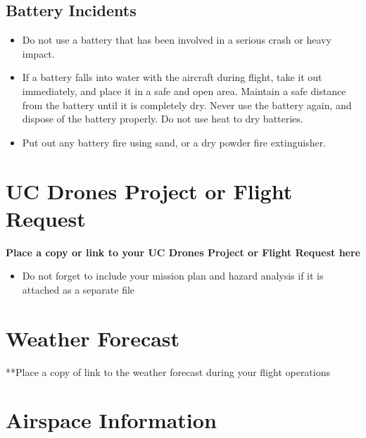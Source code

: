 \documentclass[
]{book}
\makeatletter
\providecommand{\tightlist}{%
  \setlength{\itemsep}{0pt}\setlength{\parskip}{0pt}}
\let\origdoublepage\cleardoublepage
\newcommand{\clearemptydoublepage}{\clearpage{\pagestyle{empty}\origdoublepage}}
\let\cleardoublepage\clearemptydoublepage
\renewcommand\part{%
   \if@openright
     \cleardoublepage
   \else
     \clearpage
   \fi
   \thispagestyle{empty}%
   \if@twocolumn
     \onecolumn
     \@tempswatrue
   \else
     \@tempswafalse
   \fi
   \null\vfil
   \secdef\@part\@spart}
\makeatother
\begin{document}
\hypertarget{battery-incidents}{%
\section{Battery Incidents}\label{battery-incidents}}

\begin{itemize}
\tightlist
\item
  Do not use a battery that has been involved in a serious crash or heavy impact.
\item
  If a battery falls into water with the aircraft during flight, take it out immediately, and place it in a safe and open area. Maintain a safe distance from the battery until it is completely dry. Never use the battery again, and dispose of the battery properly. Do not use heat to dry batteries.\\
\item
  Put out any battery fire using sand, or a dry powder fire extinguisher.
\end{itemize}

\hypertarget{part-mission-documentation}{%
\part{Mission Documentation}\label{part-mission-documentation}}

\hypertarget{uc-drones-project-or-flight-request}{%
\chapter{UC Drones Project or Flight Request}\label{uc-drones-project-or-flight-request}}

\textbf{Place a copy or link to your UC Drones Project or Flight Request here}

\begin{itemize}
\tightlist
\item
  Do not forget to include your mission plan and hazard analysis if it is attached as a separate file
\end{itemize}

\hypertarget{ch-weather}{%
\chapter{Weather Forecast}\label{ch-weather}}

**Place a copy of link to the weather forecast during your flight operations

\hypertarget{ch-airspace}{%
\chapter{Airspace Information}\label{ch-airspace}}
\end{document}
